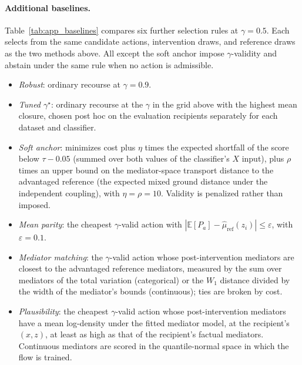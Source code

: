 \paragraph{Additional baselines.}
Table~\ref{tab:app_baselines} compares six further selection rules at
$\gamma=0.5$. Each selects from the same candidate actions, intervention
draws, and reference draws as the two methods above. All except the soft
anchor impose $\gamma$-validity and abstain under the same rule when no action
is admissible.
\begin{itemize}[nosep]
  \item \emph{Robust}: ordinary recourse at $\gamma=0.9$.
  \item \emph{Tuned $\gamma^\star$}: ordinary recourse at the $\gamma$ in the
        grid above with the highest mean closure, chosen post hoc on the
        evaluation recipients separately for each dataset and classifier.
  \item \emph{Soft anchor}: minimizes cost plus $\eta$ times the expected
        shortfall of the score below $\tau-0.05$ (summed over both values of
        the classifier's $X$ input), plus $\rho$ times an upper bound on the
        mediator-space transport distance to the advantaged reference (the
        expected mixed ground distance under the independent coupling), with
        $\eta=\rho=10$. Validity is penalized rather than imposed.
  \item \emph{Mean parity}: the cheapest $\gamma$-valid action with
        $|\mathbb E[P_a]-\hat\mu_{\mathrm{ref}}(z_i)|\le\varepsilon$, with
        $\varepsilon=0.1$.
  \item \emph{Mediator matching}: the $\gamma$-valid action whose
        post-intervention mediators are closest to the advantaged reference
        mediators, measured by the sum over mediators of the total variation
        (categorical) or the $W_1$ distance divided by the width of
        the mediator's bounds (continuous); ties are broken by cost.
  \item \emph{Plausibility}: the cheapest $\gamma$-valid action whose
        post-intervention mediators have a mean log-density under the fitted
        mediator model, at the recipient's $(x,z)$, at least as high as that
        of the recipient's factual mediators. Continuous mediators are scored
        in the quantile-normal space in which the flow is trained.
\end{itemize}

